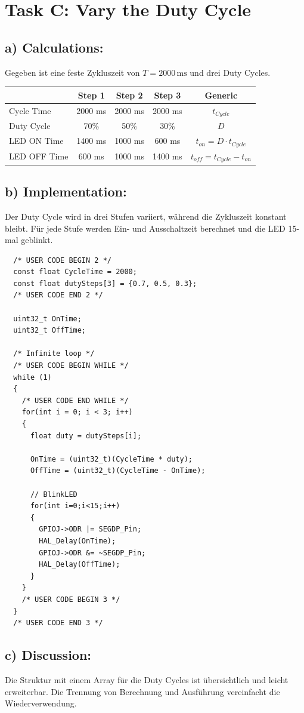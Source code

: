 
\section{Task C: Vary the Duty Cycle}

\subsection{a) Calculations:}

Gegeben ist eine feste Zykluszeit von \(T = 2000\,\mathrm{ms}\) und drei Duty Cycles.

\begin{table}[h]
	\centering
	\begin{tabular}{|l|c|c|c|c|}
		\hline
		             & \textbf{Step 1} & \textbf{Step 2} & \textbf{Step 3} & \textbf{Generic}               \\ \hline
		Cycle Time   & 2000 ms         & 2000 ms         & 2000 ms         & $t_{Cycle}$                    \\ \hline
		Duty Cycle   & 70\%            & 50\%            & 30\%            & $D$                            \\ \hline
		LED ON Time  & 1400 ms         & 1000 ms         & 600 ms          & $t_{on} = D \cdot t_{Cycle}$   \\ \hline
		LED OFF Time & 600 ms          & 1000 ms         & 1400 ms         & $t_{off} = t_{Cycle} - t_{on}$ \\ \hline
	\end{tabular}
\end{table}

\subsection{b) Implementation:}

Der Duty Cycle wird in drei Stufen variiert, während die Zykluszeit konstant bleibt. Für jede Stufe werden Ein- und Ausschaltzeit berechnet und die LED 15-mal geblinkt.

\begin{lstlisting}
  /* USER CODE BEGIN 2 */
  const float CycleTime = 2000;
  const float dutySteps[3] = {0.7, 0.5, 0.3};
  /* USER CODE END 2 */

  uint32_t OnTime;
  uint32_t OffTime;

  /* Infinite loop */
  /* USER CODE BEGIN WHILE */
  while (1)
  {
    /* USER CODE END WHILE */
    for(int i = 0; i < 3; i++)
    {
      float duty = dutySteps[i];

      OnTime = (uint32_t)(CycleTime * duty);
      OffTime = (uint32_t)(CycleTime - OnTime);

      // BlinkLED
      for(int i=0;i<15;i++)
      {
        GPIOJ->ODR |= SEGDP_Pin;
        HAL_Delay(OnTime);
        GPIOJ->ODR &= ~SEGDP_Pin;
        HAL_Delay(OffTime);
      }
    }
    /* USER CODE BEGIN 3 */
  }
  /* USER CODE END 3 */
\end{lstlisting}

\subsection{c) Discussion:}

Die Struktur mit einem Array für die Duty Cycles ist übersichtlich und leicht erweiterbar. Die Trennung von Berechnung und Ausführung vereinfacht die Wiederverwendung.
